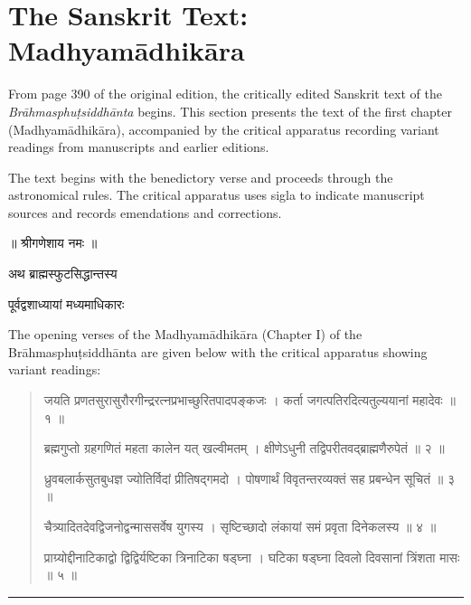 \documentclass[11pt,a4paper]{article}
\newcommand{\dev}[1]{{\devanagarifont #1}}
\newenvironment{sanskritverse}{%
  \begin{quote}
  \devanagarifont
  \small
  \color{titlecolor}
}{\end{quote}}
\theoremstyle{definition}
\begin{document}
\section{The Sanskrit Text: Madhyam\=adhik\=ara}
\label{sec:sanskrit}

From page 390 of the original edition, the critically edited Sanskrit text of the \textit{Br\=ahmasphu\d{t}siddh\=anta} begins. This section presents the text of the first chapter (Madhyam\=adhik\=ara), accompanied by the critical apparatus recording variant readings from manuscripts and earlier editions.

The text begins with the benedictory verse and proceeds through the astronomical rules. The critical apparatus uses sigla to indicate manuscript sources and records emendations and corrections.

\begin{center}
\dev{॥ श्रीगणेशाय नमः ॥}
\end{center}

\begin{center}
\Large\dev{अथ ब्राह्मस्फुटसिद्धान्तस्य}

\vspace{0.3cm}
\large\dev{पूर्वद्वशाध्यायां मध्यमाधिकारः}
\end{center}

\vspace{0.5cm}

The opening verses of the Madhyam\=adhik\=ara (Chapter I) of the Br\=ahmasphu\d{t}siddh\=anta are given below with the critical apparatus showing variant readings:

\begin{sanskritverse}
\dev{जयति प्रणतसुरासुरौरगीन्द्ररत्नप्रभाच्छुरितपादपङ्कजः ।}
\dev{कर्ता जगत्पतिरदित्यतुल्ययानां महादेवः ॥ १ ॥}

\dev{ब्रह्मगुप्तो ग्रहगणितं महता कालेन यत् खल्वीमतम् ।}
\dev{क्षीणेऽधुनी तद्विपरीतवद्ब्राह्मणैरुपेतं ॥ २ ॥}

\dev{ध्रुवबलार्कसुतबुधज्ञ ज्योतिर्विदां प्रीतिषद्गमदो ।}
\dev{पोषणार्थं विवृतन्तरव्यक्तं सह प्रबन्धेन सूचितं ॥ ३ ॥}

\dev{चैत्र्यादितदेवद्विजनोद्वन्माससर्वेष युगस्य ।}
\dev{सृष्टिच्छादो लंकायां समं प्रवृता दिनेकलस्य ॥ ४ ॥}

\dev{प्राग्र्योद्दीनाटिकाद्वो द्विद्विर्यष्टिका त्रिनाटिका षड्घ्ना ।}
\dev{घटिका षड्घ्ना दिवलो दिवसानां त्रिंशता मासः ॥ ५ ॥}
\end{sanskritverse}

\vspace{0.3cm}
\noindent\rule{0.5\textwidth}{0.4pt}
\end{document}
